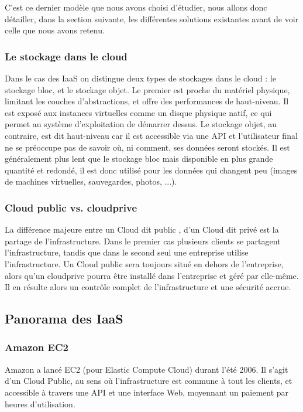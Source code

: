 \documentclass[a4paper,oneside]{report}
\begin{document}
C'est ce dernier modèle que nous avons choisi d'étudier, nous allons donc détailler, dans la section suivante, les différentes solutions existantes avant de voir celle que nous avons retenu.

\subsubsection{Le stockage dans le cloud}
Dans le cas des IaaS on distingue deux types de stockages dans le cloud : le stockage bloc, et le stockage objet.
Le premier est proche du matériel physique, limitant les couches d'abstractions, et offre des performances de haut-niveau.
Il est exposé aux instances virtuelles comme un disque physique natif, ce qui permet au système d'exploitation de démarrer dessus.\newline
Le stockage objet, au contraire, est dit \og haut-niveau \fg car il est accessible via une API et l'utilisateur final ne se préoccupe pas de savoir où, ni comment, ses données seront stockés.
Il est généralement plus lent que le stockage bloc mais disponible en plus grande quantité et redondé, il est donc utilisé pour les données qui changent peu (images de machines virtuelles, sauvegardes, photos, ...).

\subsubsection{Cloud public vs. \gls{cloudprive}}
La différence majeure entre un Cloud dit \og public \fg, d'un Cloud dit \og privé \fg est la partage de l'infrastructure.
Dans le premier cas plusieurs clients se partagent l'infrastructure, tandis que dans le second seul une entreprise utilise l'infrastructure.\newline
Un Cloud public sera toujours situé en dehors de l'entreprise, alors qu'un \gls{cloudprive} pourra être installé dans l'entreprise et géré par elle-même.
Il en résulte alors un contrôle complet de l'infrastructure et une sécurité accrue.

\subsection{Panorama des IaaS}
\subsubsection{Amazon EC2}
Amazon a lancé EC2 (pour Elastic Compute Cloud) durant l'été 2006.
Il s'agit d'un Cloud Public, au sens où l'infrastructure est commune à tout les clients, et accessible à travers une API et une interface Web, moyennant un paiement par heures d'utilisation.
\end{document}
